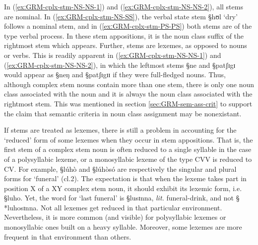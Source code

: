 

  In (\ref{exːGRM-cplx-stm-NS-NS-1}) and (\ref{exːGRM-cplx-stm-NS-NS-2}),  all 
stems are nominal. In 
(\ref{exːGRM-cplx-stm-NS-SS}),  the verbal state stem {\S hʊl} `dry'  follows
a nominal stem,  and  in  (\ref{exːGRM-cplx-stm-PS-PS}) both stems are of the
type verbal
process.  In these stem appositions, it is the noun class suffix of
the rightmost stem which appears. Further, stems are lexemes, as opposed to
nouns or verbs.  This is readily apparent in  (\ref{exːGRM-cplx-stm-NS-NS-1})
and
(\ref{exːGRM-cplx-stm-NS-NS-2}), in which the leftmost stems {\S ne} and
{\S patʃɪgɪ}
would appear as {\S neŋ} and {\S patʃɪgɪɪ} if they were full-fledged nouns.
Thus, although complex stem nouns contain more than one stem, there is only  one
noun
class associated with the noun and it is always the noun class associated with
the rightmost stem.  This was mentioned in section \ref{sec:GRM-sem-ass-crit}
to support the claim  that
semantic criteria in
noun class assignment may be  nonexistant. 


If  stems are treated as lexemes, there is still a problem in accounting for the
 `reduced' form of  some lexemes when they occur in stem appositions. That
is, the first stem  of a complex stem noun is often reduced to a single
syllable in the case of a polysyllabic lexeme, or a monosyllabic lexeme of the
type CVV is reduced to CV. For
example,  {\S lúhò}  and  {\S lúhòsó} are respectively the singular and
plural forms for 
`funeral' ({\sc cl.2}).  The expectation is that
when the lexeme takes part in position X of a XY complex stem noun,
it should exhibit its lexemic form, i.e.   {\S luho}. Yet, the word for `last
funeral'  is {\S lusɪnna}, {\it lit.} funeral-drink,  and not {\S
*luhosɪnna}.  Not all  lexemes get reduced in that particular environment.
Nevertheless, it is  more common (and visible)  for polysyllabic lexemes or
monosyllabic ones built on a heavy syllable. Moreover, some lexemes are more
frequent in that environment than others.



